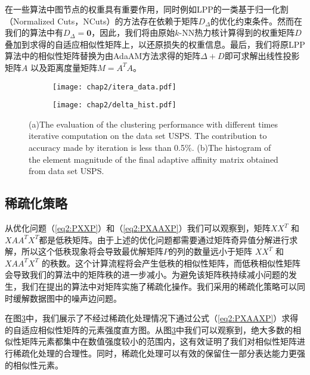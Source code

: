 在一些算法中图节点的权重具有重要作用，同时例如LPP的一类基于归一化割（Normalized Cuts，NCuts）的方法存在依赖于矩阵$D_\Delta$的优化约束条件。然而在我们的算法中有$D_\Delta = \textbf{0}$，因此，我们将由原始$k$-NN热力核计算得到的权重矩阵$D$叠加到求得的自适应相似性矩阵上，以还原损失的权重信息。最后，我们将原LPP算法中的相似性矩阵替换为由AdaAM方法求得的矩阵$\Delta+D$即可求解出线性投影矩阵$A$ 以及距离度量矩阵$M = A^TA$。

\begin{figure}[!htbp]
	\centering
	\begin{subfigure}{0.49\textwidth}
		\centering
		\texttt{[image: chap2/itera\_data.pdf]}
		\caption{}
		\label{fig2:itera}
	\end{subfigure}
	\begin{subfigure}{0.49\textwidth}
		\centering
		\texttt{[image: chap2/delta\_hist.pdf]}
		\caption{}
		\label{fig2:Hist}
	\end{subfigure}
			  {(a)The evaluation of the clustering performance with different times iterative computation on the data set USPS. The contribution to accuracy made by iteration is less than 0.5\%. (b)The histogram of the element magnitude of the final adaptive affinity matrix obtained from data set USPS. }
\end{figure}

\subsection{稀疏化策略}
\label{sec2:sparse}

从优化问题（\ref{eq2:PXXP}）和（\ref{eq2:PXAAXP}）我们可以观察到，矩阵$XX^T$ 和 $XAA^TX^T$都是低秩矩阵。由于上述的优化问题都需要通过矩阵奇异值分解进行求解，所以这个低秩现象将会导致最优解矩阵$P$的列的数量远小于矩阵 $XX^T$ 和 $XAA^TX^T$ 的秩数。这个计算流程将会产生低秩的相似性矩阵，而低秩相似性矩阵会导致我们的算法中的矩阵秩的进一步减小。为避免该矩阵秩持续减小问题的发生，我们在提出的算法中对矩阵实施了稀疏化操作。我们采用的稀疏化策略可以同时缓解数据图中的噪声边问题。

在图\ref{fig2:Hist}中，我们展示了不经过稀疏化处理情况下通过公式（\ref{eq2:PXAAXP}）求得的自适应相似性矩阵的元素强度直方图。从图\ref{fig2:Hist}中我们可以观察到，绝大多数的相似性矩阵元素都集中在数值强度较小的范围内，这有效证明了我们对相似性矩阵进行稀疏化处理的合理性。同时，稀疏化处理可以有效的保留住一部分表达能力更强的相似性元素。

